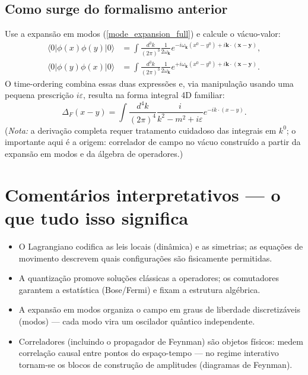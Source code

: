 \documentclass[12pt,a4paper]{article}
\begin{document}
\subsection{Como surge do formalismo anterior}
Use a expansão em modos (\ref{mode_expansion_full}) e calcule o vácuo-valor:
\begin{align*}
\langle0|\phi(x)\phi(y)|0\rangle &= \int\frac{d^3k}{(2\pi)^3}\frac{1}{2\omega_{\mathbf{k}}}e^{-i\omega_{\mathbf{k}}(x^0-y^0)+i\mathbf{k}\cdot(\mathbf{x}-\mathbf{y})}, \\
\langle0|\phi(y)\phi(x)|0\rangle &= \int\frac{d^3k}{(2\pi)^3}\frac{1}{2\omega_{\mathbf{k}}}e^{+i\omega_{\mathbf{k}}(x^0-y^0)+i\mathbf{k}\cdot(\mathbf{x}-\mathbf{y})}.
\end{align*}
O time-ordering combina essas duas expressões e, via manipulação usando uma pequena prescri\c{c}\~ao $i\varepsilon$, resulta na forma integral 4D familiar:
\[ \Delta_F(x-y) = \int\frac{d^4k}{(2\pi)^4}\frac{i}{k^2-m^2+i\varepsilon}e^{-ik\cdot(x-y)}. \]
(\textit{Nota:} a derivação completa requer tratamento cuidadoso das integrais em $k^0$; o importante aqui é a origem: correlador de campo no vácuo construído a partir da expansão em modos e da álgebra de operadores.)

\section{Comentários interpretativos — o que tudo isso significa}
\begin{itemize}
  \item O Lagrangiano codifica as leis locais (dinâmica) e as simetrias; as equações de movimento descrevem quais configurações são fisicamente permitidas.
  \item A quantização promove soluções clássicas a operadores; os comutadores garantem a estatística (Bose/Fermi) e fixam a estrutura algébrica.
  \item A expansão em modos organiza o campo em graus de liberdade discretizáveis (modos) — cada modo vira um oscilador quântico independente.
  \item Correladores (incluindo o propagador de Feynman) são objetos físicos: medem correlação causal entre pontos do espaço-tempo — no regime interativo tornam-se os blocos de construção de amplitudes (diagramas de Feynman).
\end{itemize}
\end{document}
